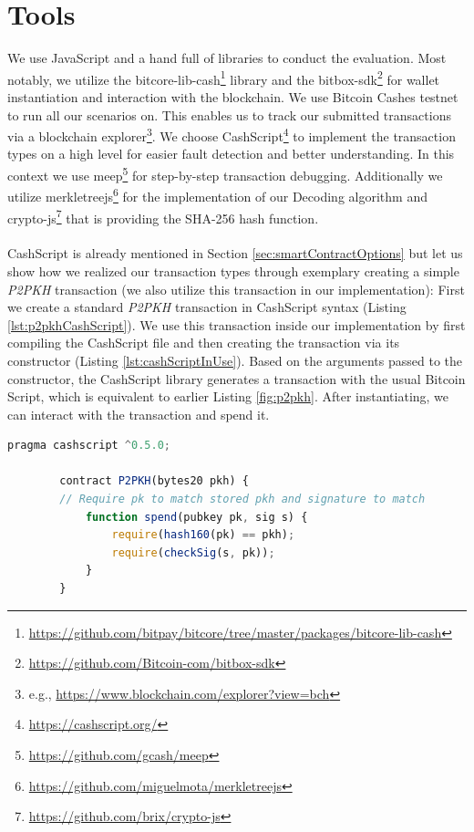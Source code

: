 \documentclass{cacthesis}
\begin{document}
	    \section{Tools}
        We use JavaScript and a hand full of libraries to conduct the evaluation. Most notably, we utilize the bitcore-lib-cash\footnote{\url{https://github.com/bitpay/bitcore/tree/master/packages/bitcore-lib-cash}} library and the bitbox-sdk\footnote{\url{https://github.com/Bitcoin-com/bitbox-sdk}} for wallet instantiation and interaction with the blockchain. We use Bitcoin Cashes testnet to run all our scenarios on. This enables us to track our submitted transactions via a blockchain explorer\footnote{e.g., \url{https://www.blockchain.com/explorer?view=bch}}. We choose CashScript\footnote{\url{https://cashscript.org/}} to implement the transaction types on a high level for easier fault detection and better understanding. In this context we use meep\footnote{\url{https://github.com/gcash/meep}} for step-by-step transaction debugging. Additionally we utilize merkletreejs\footnote{\url{https://github.com/miguelmota/merkletreejs}} for the implementation of our Decoding algorithm and crypto-js\footnote{\url{https://github.com/brix/crypto-js}} that is providing the SHA-256 hash function. \\\\  
        CashScript is already mentioned in Section \ref{sec:smartContractOptions} but let us show how we realized our transaction types through exemplary creating a simple \textit{P2PKH} transaction (we also utilize this transaction in our implementation): First we create a standard \textit{P2PKH} transaction in CashScript syntax (Listing \ref{lst:p2pkhCashScript}). We use this transaction inside our implementation by first compiling the CashScript file and then creating the transaction via its constructor (Listing \ref{lst:cashScriptInUse}). Based on the arguments passed to the constructor, the CashScript library generates a transaction with the usual Bitcoin Script, which is equivalent to earlier Listing \ref{fig:p2pkh}. After instantiating, we can interact with the transaction and spend it.
	    
	    \begin{minipage}{\linewidth}
        \begin{lstlisting}[language=JavaScript, basicstyle=\footnotesize, caption= p2pkh.cash - Bitcoin \textit{P2PKH} in high-level CashScript, captionpos=b, backgroundcolor=\color{backcolour}, label=lst:p2pkhCashScript]
        pragma cashscript ^0.5.0;
        
        contract P2PKH(bytes20 pkh) {
        // Require pk to match stored pkh and signature to match
            function spend(pubkey pk, sig s) {
                require(hash160(pk) == pkh);
                require(checkSig(s, pk));
            }
        }
        \end{lstlisting}
        \end{minipage}
        
\end{document}
